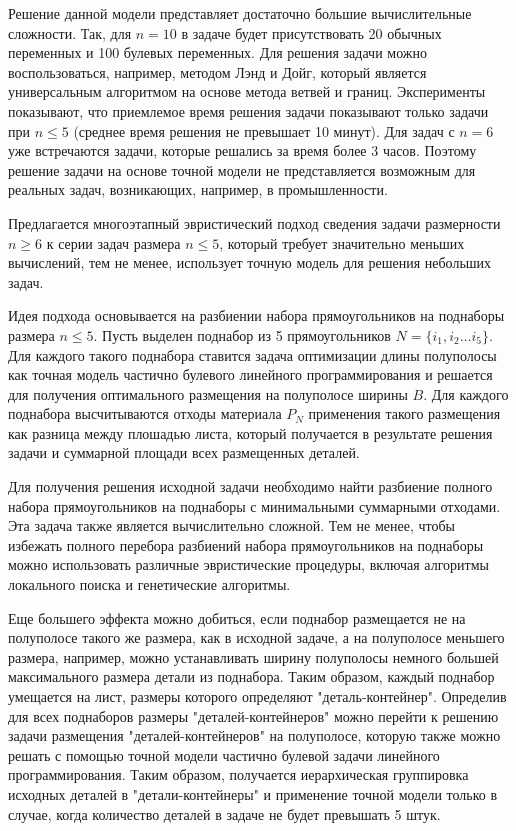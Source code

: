 Решение данной модели представляет достаточно большие вычислительные сложности. Так, для $n=10$ в задаче будет присутствовать 20 обычных переменных и 100 булевых переменных. Для решения задачи можно воспользоваться, например, методом Лэнд и Дойг, который является универсальным алгоритмом на основе метода ветвей и границ. Эксперименты показывают, что приемлемое время решения задачи показывают только задачи при $n\le 5$ (среднее время решения не превышает 10 минут). Для задач с $n=6$ уже встречаются задачи, которые решались за время более 3 часов. Поэтому решение задачи на основе точной модели не представляется возможным для реальных задач, возникающих, например, в промышленности.

Предлагается многоэтапный эвристический подход сведения задачи размерности $n\ge 6$ к серии задач размера $n\le 5$, который требует значительно меньших вычислений, тем не менее, использует точную модель для решения небольших задач.

Идея подхода основывается на разбиении набора прямоугольников на поднаборы размера $n\le 5$. Пусть выделен поднабор из 5 прямоугольников $N=\{i_1, i_2\ldots i_5\}$. Для каждого такого поднабора ставится задача оптимизации длины полуполосы как точная модель частично булевого линейного программирования и решается для получения оптимального размещения на полуполосе ширины $B$. Для каждого поднабора высчитываются отходы материала $P_N$ применения такого размещения как разница между плошадью листа, который получается в результате решения задачи и суммарной площади всех размещенных  деталей. 

Для получения решения исходной задачи необходимо найти разбиение полного набора прямоугольников на поднаборы с минимальными суммарными отходами. Эта задача также является вычислительно сложной. Тем не менее, чтобы избежать полного перебора разбиений набора прямоугольников на поднаборы можно использовать различные эвристические процедуры, включая алгоритмы локального поиска и генетические алгоритмы. 

Еще большего эффекта можно добиться, если поднабор размещается не на полуполосе такого же размера, как в исходной задаче, а на полуполосе меньшего размера, например, можно устанавливать ширину полуполосы немного большей максимального размера детали из поднабора. Таким образом, каждый поднабор умещается на лист, размеры которого определяют "деталь-контейнер". Определив для всех поднаборов размеры "деталей-контейнеров" можно перейти к решению задачи размещения "деталей-контейнеров" на полуполосе, которую также можно решать с помощью точной модели частично булевой задачи линейного программирования. Таким образом, получается иерархическая группировка исходных деталей в "детали-контейнеры" и применение точной модели только в случае, когда количество деталей в задаче не будет превышать 5 штук.

